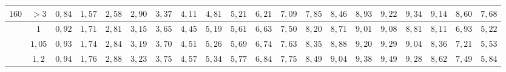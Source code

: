 \begin{table}[]
{\begin{tabular}{|c|c|c|c|c|c|c|c|c|c|c|c|c|c|c|c|c|c|c|c|}
\multirow{-5}{*}{$160$} & $>3$                                                                                & \cellcolor[HTML]{FFCCC9}$0,84$ & \cellcolor[HTML]{FFCCC9}$1,57$ & \cellcolor[HTML]{FD6864}$2,58$ & \cellcolor[HTML]{FD6864}$2,90$ & \cellcolor[HTML]{FD6864}$3,37$ & \cellcolor[HTML]{FE0000}$4,11$ & \cellcolor[HTML]{FE0000}$4,81$ & \cellcolor[HTML]{FE0000}$5,21$ & \cellcolor[HTML]{CB0000}$6,21$ & \cellcolor[HTML]{9A0000}$7,09$ & \cellcolor[HTML]{9A0000}$7,85$ & \cellcolor[HTML]{F8A102}$8,46$ & \cellcolor[HTML]{F56B00}$8,93$                        & \cellcolor[HTML]{F56B00}$9,22$ & \cellcolor[HTML]{CE6301}$9,34$ & \cellcolor[HTML]{963400}$9,14$ & \cellcolor[HTML]{963400}$8,60$ & \cellcolor[HTML]{963400}$7,68$ \\ \hline
                        & $1$                                                                                 & \cellcolor[HTML]{FFCCC9}$0,92$ & \cellcolor[HTML]{FFCCC9}$1,71$ & \cellcolor[HTML]{FD6864}$2,81$ & \cellcolor[HTML]{FD6864}$3,15$ & \cellcolor[HTML]{FD6864}$3,65$ & \cellcolor[HTML]{FE0000}$4,45$ & \cellcolor[HTML]{FE0000}$5,19$ & \cellcolor[HTML]{CB0000}$5,61$ & \cellcolor[HTML]{CB0000}$6,63$ & \cellcolor[HTML]{9A0000}$7,50$ & \cellcolor[HTML]{F8A102}$8,20$ & \cellcolor[HTML]{F56B00}$8,71$ & \cellcolor[HTML]{F56B00}$9,01$                        & \cellcolor[HTML]{CE6301}$9,08$ & \cellcolor[HTML]{963400}$8,81$ & \cellcolor[HTML]{963400}$8,11$ & \cellcolor[HTML]{963400}$6,93$ & \cellcolor[HTML]{963400}$5,22$ \\ \cline{2-20} 
                        & $1,05$                                                                              & \cellcolor[HTML]{FFCCC9}$0,93$ & \cellcolor[HTML]{FFCCC9}$1,74$ & \cellcolor[HTML]{FD6864}$2,84$ & \cellcolor[HTML]{FD6864}$3,19$ & \cellcolor[HTML]{FD6864}$3,70$ & \cellcolor[HTML]{FE0000}$4,51$ & \cellcolor[HTML]{FE0000}$5,26$ & \cellcolor[HTML]{CB0000}$5,69$ & \cellcolor[HTML]{CB0000}$6,74$ & \cellcolor[HTML]{9A0000}$7,63$ & \cellcolor[HTML]{F8A102}$8,35$ & \cellcolor[HTML]{F56B00}$8,88$ & \cellcolor[HTML]{F56B00}$9,20$                        & \cellcolor[HTML]{CE6301}$9,29$ & \cellcolor[HTML]{963400}$9,04$ & \cellcolor[HTML]{963400}$8,36$ & \cellcolor[HTML]{963400}$7,21$ & \cellcolor[HTML]{963400}$5,53$ \\ \cline{2-20} 
                        & $1,2$                                                                               & \cellcolor[HTML]{FFCCC9}$0,94$ & \cellcolor[HTML]{FFCCC9}$1,76$ & \cellcolor[HTML]{FD6864}$2,88$ & \cellcolor[HTML]{FD6864}$3,23$ & \cellcolor[HTML]{FD6864}$3,75$ & \cellcolor[HTML]{FE0000}$4,57$ & \cellcolor[HTML]{FE0000}$5,34$ & \cellcolor[HTML]{CB0000}$5,77$ & \cellcolor[HTML]{CB0000}$6,84$ & \cellcolor[HTML]{9A0000}$7,75$ & \cellcolor[HTML]{F8A102}$8,49$ & \cellcolor[HTML]{F56B00}$9,04$ & \cellcolor[HTML]{F56B00}$9,38$                        & \cellcolor[HTML]{CE6301}$9,49$ & \cellcolor[HTML]{963400}$9,28$ & \cellcolor[HTML]{963400}$8,62$ & \cellcolor[HTML]{963400}$7,49$ & \cellcolor[HTML]{963400}$5,84$ \\ \cline{2-20} 

\end{tabular}}
\end{table}
